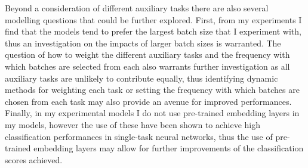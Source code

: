 Beyond a consideration of different auxiliary tasks there are also several modelling questions that could be further explored.
First, from my experiments I find that the models tend to prefer the largest batch size that I experiment with, thus an investigation on the impacts of larger batch sizes is warranted.
The question of how to weight the different auxiliary tasks and the frequency with which batches are selected from each also warrants further investigation as all auxiliary tasks are unlikely to contribute equally, thus identifying dynamic methods for weighting each task or setting the frequency with which batches are chosen from each task may also provide an avenue for improved performances.
Finally, in my experimental models I do not use pre-trained embedding layers in my models, however the use of these have been shown to achieve high classification performances in single-task neural networks, thus the use of pre-trained embedding layers may allow for further improvements of the classification scores achieved.
